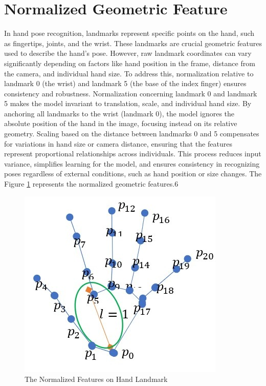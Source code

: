 \section{Normalized Geometric Feature}
In hand pose recognition, landmarks represent specific points on the hand, such as fingertips, joints, and the wrist. These landmarks are crucial geometric features used to describe the hand's pose. However, raw landmark coordinates can vary significantly depending on factors like hand position in the frame, distance from the camera, and individual hand size. To address this, normalization relative to landmark 0 (the wrist) and landmark 5 (the base of the index finger) ensures consistency and robustness. Normalization concerning landmark 0 and landmark 5 makes the model invariant to translation, scale, and individual hand size. By anchoring all landmarks to the wrist (landmark 0), the model ignores the absolute position of the hand in the image, focusing instead on its relative geometry. Scaling based on the distance between landmarks 0 and 5 compensates for variations in hand size or camera distance, ensuring that the features represent proportional relationships across individuals. This process reduces input variance, simplifies learning for the model, and ensures consistency in recognizing poses regardless of external conditions, such as hand position or size changes. The Figure \ref{fig:hand_feature_norm} represents the normalized geometric features.6
\begin{figure}[h]
	\centering
	\includegraphics[width=0.7\linewidth]{img/hand_feature_normalized} 
	\caption{The Normalized Features on Hand Landmark}
	\label{fig:hand_feature_norm} %
\end{figure}

